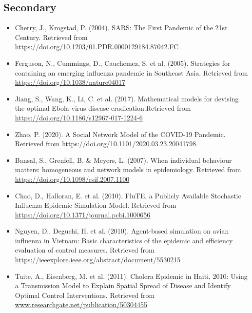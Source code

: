 \documentclass[12pt, a4paper]{extarticle}
\begin{document}
        \subsection{Secondary}
            \begin{itemize}
                \item Cherry, J., Krogstad, P. (2004). SARS: The First Pandemic of the 21st Century. Retrieved from \url{https://doi.org/10.1203/01.PDR.0000129184.87042.FC}
                
                \item Ferguson, N., Cummings, D., Cauchemez, S. et al. (2005). Strategies for containing an emerging influenza pandemic in Southeast Asia. Retrieved from \url{https://doi.org/10.1038/nature04017}
                
                \item Jiang, S., Wang, K., Li, C. et al. (2017). Mathematical models for devising the optimal Ebola virus disease eradication.Retrieved from \url{https://doi.org/10.1186/s12967-017-1224-6}
                
                \item Zhao, P. (2020). A Social Network Model of the COVID-19 Pandemic. Retrieved from \url{https://doi.org/10.1101/2020.03.23.20041798}.
                
                \item Bansal, S., Grenfell, B. \& Meyers, L. (2007). When individual behaviour matters: homogeneous and network models in epidemiology. Retrieved from \url{https://doi.org/10.1098/rsif.2007.1100}
                
                \item Chao, D., Halloran, E. et al. (2010). FluTE, a Publicly Available Stochastic Influenza Epidemic Simulation Model. Retrieved from \url{https://doi.org/10.1371/journal.pcbi.1000656}
                
                \item Nguyen, D., Deguchi, H. et al. (2010). Agent-based simulation on avian influenza in Vietnam: Basic characteristics of the epidemic and efficiency evaluation of control measures. Retrieved from\\ \url{https://ieeexplore.ieee.org/abstract/document/5530215}
                
                \item Tuite, A., Eisenberg, M. et al. (2011). Cholera Epidemic in Haiti, 2010: Using a Transmission Model to Explain Spatial Spread of Disease and Identify Optimal Control Interventions. Retrieved from \url{www.researchgate.net/publication/50304455}
                

\end{itemize}
\end{document}
